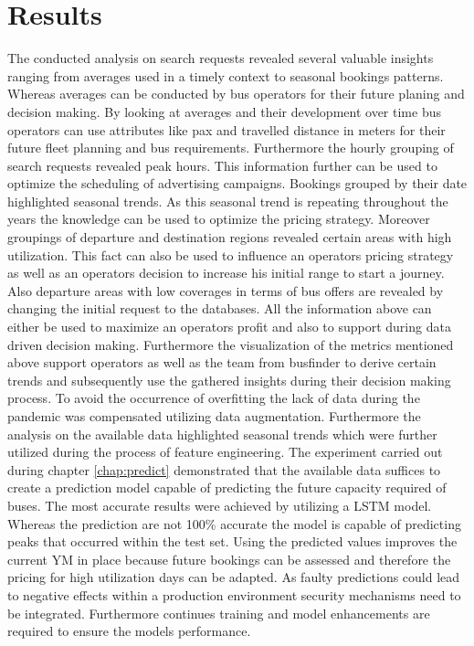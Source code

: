 %
%
% 
% 
% 

\chapter{Results}
\label{chap:results}
The conducted analysis on search requests revealed several valuable insights ranging from averages used in a timely context to seasonal bookings patterns. Whereas averages can be conducted by bus operators for their future planing and decision making. By looking at averages and their development over time bus operators can use attributes like pax and travelled distance in meters for their future fleet planning and bus requirements. Furthermore the hourly grouping of search requests revealed peak hours. This information further can be used to optimize the scheduling of advertising campaigns. Bookings grouped by their date highlighted seasonal trends. As this seasonal trend is repeating throughout the years the knowledge can be used to optimize the pricing strategy. Moreover groupings of departure and destination regions revealed certain areas with high utilization. This fact can also be used to influence an operators pricing strategy as well as an operators decision to increase his initial range to start a journey. Also departure areas with low coverages in terms of bus offers are revealed by changing the initial request to the databases. All the information above can either be used to maximize an operators profit and also to support during data driven decision making. Furthermore the visualization of the metrics mentioned above support operators as well as the team from busfinder to derive certain trends and subsequently use the gathered insights during their decision making process. 
\newline
\newline
To avoid the occurrence of overfitting the lack of data during the pandemic was compensated utilizing data augmentation. Furthermore the analysis on the available data highlighted seasonal trends which were further utilized during the process of feature engineering. 
The experiment carried out during chapter \ref{chap:predict} demonstrated that the available data suffices to create a prediction model capable of predicting the future capacity required of buses. The most accurate results were achieved by utilizing a LSTM model. Whereas the prediction are not 100\% accurate the model is capable of predicting peaks that occurred within the test set. Using the predicted values improves the current YM in place because future bookings can be assessed and therefore the pricing for high utilization days can be adapted. As faulty predictions could lead to negative effects within a production environment security mechanisms need to be integrated. Furthermore continues training and model enhancements are required to ensure the models performance.